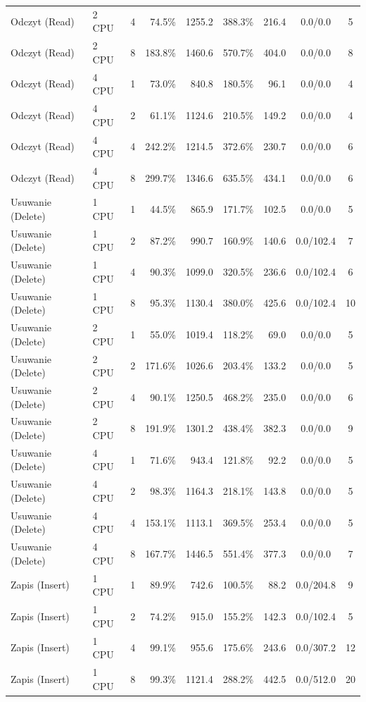 \begin{table}[ht]
{\begin{tabular}{llcrrrrcc}
Odczyt (Read) & 2 CPU & 4 & 74.5\% & 1255.2 & 388.3\% & 216.4 & 0.0/0.0 & 5 \\
Odczyt (Read) & 2 CPU & 8 & 183.8\% & 1460.6 & 570.7\% & 404.0 & 0.0/0.0 & 8 \\
Odczyt (Read) & 4 CPU & 1 & 73.0\% & 840.8 & 180.5\% & 96.1 & 0.0/0.0 & 4 \\
Odczyt (Read) & 4 CPU & 2 & 61.1\% & 1124.6 & 210.5\% & 149.2 & 0.0/0.0 & 4 \\
Odczyt (Read) & 4 CPU & 4 & 242.2\% & 1214.5 & 372.6\% & 230.7 & 0.0/0.0 & 6 \\
Odczyt (Read) & 4 CPU & 8 & 299.7\% & 1346.6 & 635.5\% & 434.1 & 0.0/0.0 & 6 \\
Usuwanie (Delete) & 1 CPU & 1 & 44.5\% & 865.9 & 171.7\% & 102.5 & 0.0/0.0 & 5 \\
Usuwanie (Delete) & 1 CPU & 2 & 87.2\% & 990.7 & 160.9\% & 140.6 & 0.0/102.4 & 7 \\
Usuwanie (Delete) & 1 CPU & 4 & 90.3\% & 1099.0 & 320.5\% & 236.6 & 0.0/102.4 & 6 \\
Usuwanie (Delete) & 1 CPU & 8 & 95.3\% & 1130.4 & 380.0\% & 425.6 & 0.0/102.4 & 10 \\
Usuwanie (Delete) & 2 CPU & 1 & 55.0\% & 1019.4 & 118.2\% & 69.0 & 0.0/0.0 & 5 \\
Usuwanie (Delete) & 2 CPU & 2 & 171.6\% & 1026.6 & 203.4\% & 133.2 & 0.0/0.0 & 5 \\
Usuwanie (Delete) & 2 CPU & 4 & 90.1\% & 1250.5 & 468.2\% & 235.0 & 0.0/0.0 & 6 \\
Usuwanie (Delete) & 2 CPU & 8 & 191.9\% & 1301.2 & 438.4\% & 382.3 & 0.0/0.0 & 9 \\
Usuwanie (Delete) & 4 CPU & 1 & 71.6\% & 943.4 & 121.8\% & 92.2 & 0.0/0.0 & 5 \\
Usuwanie (Delete) & 4 CPU & 2 & 98.3\% & 1164.3 & 218.1\% & 143.8 & 0.0/0.0 & 5 \\
Usuwanie (Delete) & 4 CPU & 4 & 153.1\% & 1113.1 & 369.5\% & 253.4 & 0.0/0.0 & 5 \\
Usuwanie (Delete) & 4 CPU & 8 & 167.7\% & 1446.5 & 551.4\% & 377.3 & 0.0/0.0 & 7 \\
Zapis (Insert) & 1 CPU & 1 & 89.9\% & 742.6 & 100.5\% & 88.2 & 0.0/204.8 & 9 \\
Zapis (Insert) & 1 CPU & 2 & 74.2\% & 915.0 & 155.2\% & 142.3 & 0.0/102.4 & 5 \\
Zapis (Insert) & 1 CPU & 4 & 99.1\% & 955.6 & 175.6\% & 243.6 & 0.0/307.2 & 12 \\
Zapis (Insert) & 1 CPU & 8 & 99.3\% & 1121.4 & 288.2\% & 442.5 & 0.0/512.0 & 20 \\

\end{tabular}}
\end{table}

